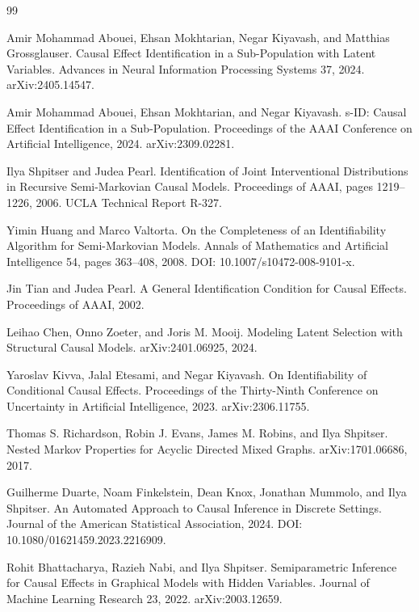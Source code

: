 \documentclass{article}
\begin{document}
\begin{thebibliography}{99}

   Amir Mohammad Abouei, Ehsan Mokhtarian, Negar Kiyavash, and Matthias Grossglauser. Causal Effect Identification in a Sub-Population with Latent Variables. Advances in Neural Information Processing Systems 37, 2024. arXiv:2405.14547.

   Amir Mohammad Abouei, Ehsan Mokhtarian, and Negar Kiyavash. s-ID: Causal Effect Identification in a Sub-Population. Proceedings of the AAAI Conference on Artificial Intelligence, 2024. arXiv:2309.02281.

   Ilya Shpitser and Judea Pearl. Identification of Joint Interventional Distributions in Recursive Semi-Markovian Causal Models. Proceedings of AAAI, pages 1219--1226, 2006. UCLA Technical Report R-327.

   Yimin Huang and Marco Valtorta. On the Completeness of an Identifiability Algorithm for Semi-Markovian Models. Annals of Mathematics and Artificial Intelligence 54, pages 363--408, 2008. DOI: 10.1007/s10472-008-9101-x.

   Jin Tian and Judea Pearl. A General Identification Condition for Causal Effects. Proceedings of AAAI, 2002.

   Leihao Chen, Onno Zoeter, and Joris M. Mooij. Modeling Latent Selection with Structural Causal Models. arXiv:2401.06925, 2024.

   Yaroslav Kivva, Jalal Etesami, and Negar Kiyavash. On Identifiability of Conditional Causal Effects. Proceedings of the Thirty-Ninth Conference on Uncertainty in Artificial Intelligence, 2023. arXiv:2306.11755.

   Thomas S. Richardson, Robin J. Evans, James M. Robins, and Ilya Shpitser. Nested Markov Properties for Acyclic Directed Mixed Graphs. arXiv:1701.06686, 2017.

   Guilherme Duarte, Noam Finkelstein, Dean Knox, Jonathan Mummolo, and Ilya Shpitser. An Automated Approach to Causal Inference in Discrete Settings. Journal of the American Statistical Association, 2024. DOI: 10.1080/01621459.2023.2216909.

   Rohit Bhattacharya, Razieh Nabi, and Ilya Shpitser. Semiparametric Inference for Causal Effects in Graphical Models with Hidden Variables. Journal of Machine Learning Research 23, 2022. arXiv:2003.12659.


\end{thebibliography}
\end{document}
